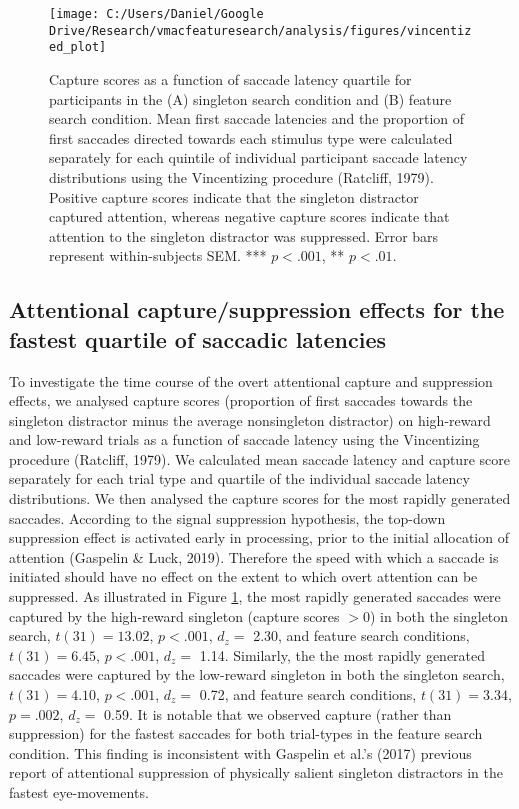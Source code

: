 \documentclass[jou, a4paper, noextraspace,floatsintext]{apa6}
\theoremstyle{definition}
\theoremstyle{definition}
\theoremstyle{definition}
\theoremstyle{remark}
\begin{document}
\begin{figure}

{\centering \texttt{[image: C:/Users/Daniel/Google Drive/Research/vmacfeaturesearch/analysis/figures/vincentized\_plot]} 

}

\caption{Capture scores as a function of saccade latency
quartile for participants in the (A) singleton search condition and (B)
feature search condition. Mean first saccade latencies and the
proportion of first saccades directed towards each stimulus type were
calculated separately for each quintile of individual participant
saccade latency distributions using the Vincentizing procedure
(Ratcliff, 1979). Positive capture scores indicate that the singleton
distractor captured attention, whereas negative capture scores indicate
that attention to the singleton distractor was suppressed. Error bars
represent within-subjects SEM. *** \(p<.001\), ** \(p<.01\).}\label{fig:VincentizedPlot}
\end{figure}

\subsection{Attentional capture/suppression effects for the fastest
quartile of saccadic
latencies}\label{attentional-capturesuppression-effects-for-the-fastest-quartile-of-saccadic-latencies}

To investigate the time course of the overt attentional capture and
suppression effects, we analysed capture scores (proportion of first
saccades towards the singleton distractor minus the average nonsingleton
distractor) on high-reward and low-reward trials as a function of
saccade latency using the Vincentizing procedure (Ratcliff, 1979). We
calculated mean saccade latency and capture score separately for each
trial type and quartile of the individual saccade latency distributions.
We then analysed the capture scores for the most rapidly generated
saccades. According to the signal suppression hypothesis, the top-down
suppression effect is activated early in processing, prior to the
initial allocation of attention (Gaspelin \& Luck, 2019). Therefore the
speed with which a saccade is initiated should have no effect on the
extent to which overt attention can be suppressed. As illustrated in
Figure \ref{fig:VincentizedPlot}, the most rapidly generated saccades
were captured by the high-reward singleton (capture scores \(>0\)) in
both the singleton search, \(t(31) = 13.02\), \(p < .001\), \(d_z=\)
2.30, and feature search conditions, \(t(31) = 6.45\), \(p < .001\),
\(d_z=\) 1.14. Similarly, the the most rapidly generated saccades were
captured by the low-reward singleton in both the singleton search,
\(t(31) = 4.10\), \(p < .001\), \(d_z=\) 0.72, and feature search
conditions, \(t(31) = 3.34\), \(p = .002\), \(d_z=\) 0.59. It is notable
that we observed capture (rather than suppression) for the fastest
saccades for both trial-types in the feature search condition. This
finding is inconsistent with Gaspelin et al.'s (2017) previous report of
attentional suppression of physically salient singleton distractors in
the fastest eye-movements.
\end{document}
